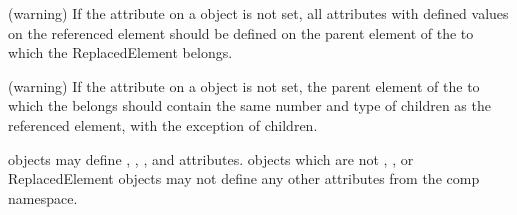 \begin{sbmlenum}
 { (warning) If the  attribute on a
  \ReplacedElement object is not set, all attributes with defined values
  on the referenced element should be defined on the parent element of
  the \ListOfReplacedElements to which the ReplacedElement belongs.} 

 { (warning) If the  attribute on a
  \ReplacedElement object is not set, the parent element of the
  \ListOfReplacedElements to which the \ReplacedElement belongs should
  contain the same number and type of children as the referenced
  element, with the exception of \ListOfReplacedElements children.} 

 { \SBaseRef objects may define ,
  , , and  attributes.
  \SBaseRef objects which are not \Port, \Deletion, or ReplacedElement
  objects may not define any other attributes from the comp namespace.}

\end{sbmlenum}
